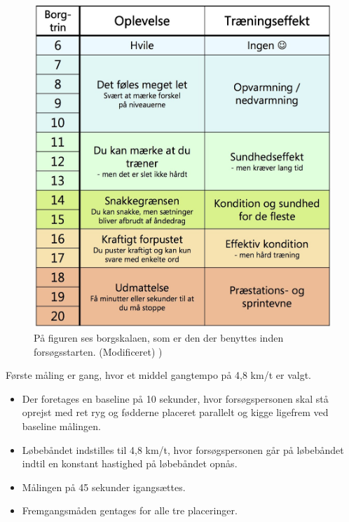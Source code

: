\begin{figure}[H]
	\centering
	\includegraphics[scale=0.5]{figures/qBilag/Borg-skala.jpg}
	\caption{På figuren ses borgskalaen, som er den der benyttes inden forsøgsstarten. (Modificeret) \cite{})}
	\label{fig:borgskala}
\end{figure}

Første måling er gang, hvor et middel gangtempo på 4,8 km/t er valgt\citep{Miles2007}. \vspace{-3mm}
\begin{itemize}
		\item Der foretages en baseline på 10 sekunder, hvor forsøgspersonen skal stå oprejst med ret ryg og fødderne placeret parallelt og kigge ligefrem ved baseline målingen.
		\item Løbebåndet indstilles til 4,8 km/t, hvor forsøgspersonen går på løbebåndet indtil en konstant hastighed på løbebåndet opnås. 
		\item Målingen på 45 sekunder igangsættes.
		\item Fremgangsmåden gentages for alle tre placeringer. 
\end{itemize}
 
